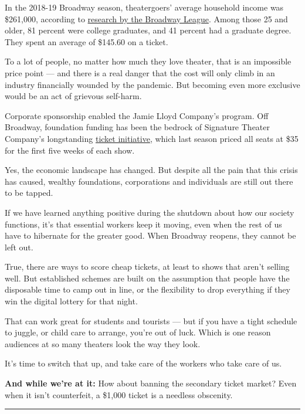 In the 2018-19 Broadway season, theatergoers' average household income
was \$261,000, according to
\href{https://www.broadwayleague.com/research/research-reports/}{research
by the Broadway League}. Among those 25 and older, 81 percent were
college graduates, and 41 percent had a graduate degree. They spent an
average of \$145.60 on a ticket.

To a lot of people, no matter how much they love theater, that is an
impossible price point --- and there is a real danger that the cost will
only climb in an industry financially wounded by the pandemic. But
becoming even more exclusive would be an act of grievous self-harm.

Corporate sponsorship enabled the Jamie Lloyd Company's program. Off
Broadway, foundation funding has been the bedrock of Signature Theater
Company's longstanding
\href{https://www.signaturetheatre.org/Support/Ticket-Initiative.aspx}{ticket
initiative}, which last season priced all seats at \$35 for the first
five weeks of each show.

Yes, the economic landscape has changed. But despite all the pain that
this crisis has caused, wealthy foundations, corporations and
individuals are still out there to be tapped.

If we have learned anything positive during the shutdown about how our
society functions, it's that essential workers keep it moving, even when
the rest of us have to hibernate for the greater good. When Broadway
reopens, they cannot be left out.

True, there are ways to score cheap tickets, at least to shows that
aren't selling well. But established schemes are built on the assumption
that people have the disposable time to camp out in line, or the
flexibility to drop everything if they win the digital lottery for that
night.

That can work great for students and tourists --- but if you have a
tight schedule to juggle, or child care to arrange, you're out of luck.
Which is one reason audiences at so many theaters look the way they
look.

It's time to switch that up, and take care of the workers who take care
of us.

\textbf{And while we're at it:} How about banning the secondary ticket
market? Even when it isn't counterfeit, a \$1,000 ticket is a needless
obscenity.

\begin{center}\rule{0.5\linewidth}{\linethickness}\end{center}

